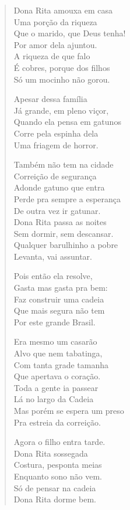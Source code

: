 \begin{verse}
Dona Rita amouxa em casa\\
Uma porção da riqueza\\
Que o marido, que Deus tenha!\\
Por amor dela ajuntou.\\
A riqueza de que falo\\
É cobres, porque dos filhos\\
Só um mocinho não gorou.

Apesar dessa família\\
Já grande, em pleno viçor,\\
Quando ela pensa em gatunos\\
Corre pela espinha dela\\
Uma friagem de horror.

Também não tem na cidade\\
Correição de segurança\\
Adonde gatuno que entra\\
Perde pra sempre a esperança\\
De outra vez ir gatunar.\\
Dona Rita passa as noites\\
Sem dormir, sem descansar.\\
Qualquer barulhinho a pobre\\
Levanta, vai assuntar.

Pois então ela resolve,\\
Gasta mas gasta pra bem:\\
Faz construir uma cadeia\\
Que mais segura não tem\\
Por este grande Brasil.

Era mesmo um casarão\\
Alvo que nem tabatinga,\\
Com tanta grade tamanha\\
Que apertava o coração.\\
Toda a gente ia passear\\
Lá no largo da Cadeia\\
Mas porém se espera um preso\\
Pra estreia da correição.

Agora o filho entra tarde.\\
Dona Rita sossegada\\
Costura, pesponta meias\\
Enquanto sono não vem.\\
Só de pensar na cadeia\\
Dona Rita dorme bem.


\end{verse}
